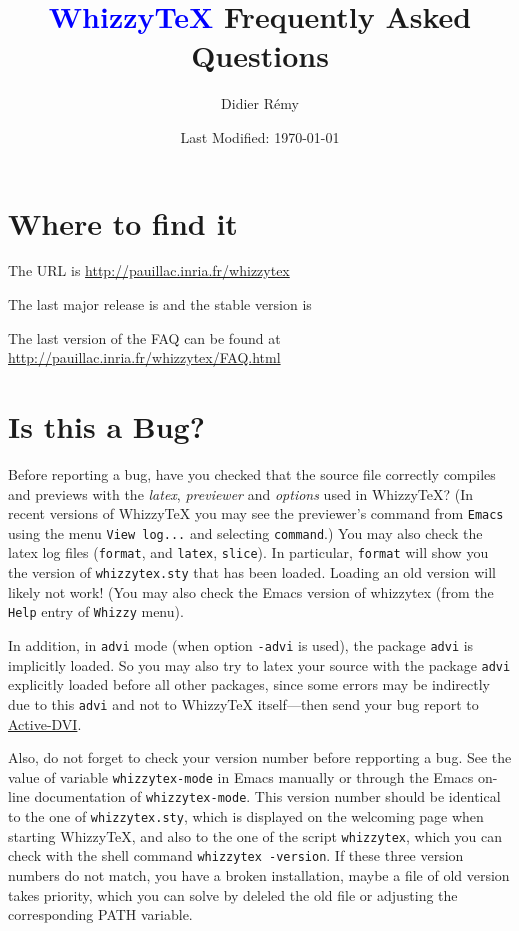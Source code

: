 \documentclass{article}
\title {\textcolor{blue}{WhizzyTeX}  Frequently Asked Questions}
\author {Didier R{\'{e}}my}
\date {Last Modified: \today}
\def \WhizzyTeX{Whizzy\TeX}
\begin{document}
\maketitle

\tableofcontents

\section {Where to find it}

The URL is \url{http://pauillac.inria.fr/whizzytex}

The last major release is {\release}
and the stable version is {\version}

The last version of the FAQ can be found at 
\url{http://pauillac.inria.fr/whizzytex/FAQ.html}

\hypertarget{isitabug}{}
\section {Is this a Bug?}

Before reporting a bug, have you checked that the source file correctly
compiles and previews with the \emph{latex}, \emph{previewer}
and \emph{options} used in {\WhizzyTeX}?
(In recent versions of {\WhizzyTeX} you may see the previewer's command from 
\texttt{Emacs} using the menu \texttt{View log...} and selecting
\texttt{command}.) You may also check the latex log files (\texttt{format}, and
\texttt{latex}, \texttt{slice}). In particular, \texttt{format} will show
you the version of \texttt{whizzytex.sty} that has been loaded. Loading an
old version will likely not work! (You may also check the Emacs version of
whizzytex (from the \texttt{Help} entry of \texttt{Whizzy} menu). 

In addition, in \texttt{advi} mode (when option \texttt{-advi} is used), the
package \texttt{advi} is implicitly loaded. So you may also try to latex
your source with the package \texttt{advi} explicitly loaded before all
other packages, since some errors may be indirectly due to this
\texttt{advi} and not to {\WhizzyTeX} itself---then send your bug report
to \href{http://pauillac.inria.fr/advi/}{Active-DVI}.

Also, do not forget to check your version number before repporting a bug. 
See the value of variable \texttt{whizzytex-mode} in Emacs manually or
through the Emacs on-line documentation of \texttt{whizzytex-mode}. 
This version number should be identical to the one of
\texttt{whizzytex.sty}, which is displayed on the welcoming page when
starting WhizzyTeX, and also  to the one of the script \texttt{whizzytex},
which you can check with the shell command \texttt{whizzytex -version}.
If these three version numbers do not match, you have a broken
installation, maybe a file of old version takes priority, which you can
solve by deleled the old file or adjusting the corresponding PATH variable.
\end{document}
